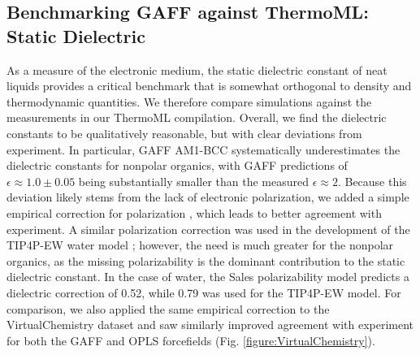 \documentclass[aps,pre,twocolumn,nofootinbib,superscriptaddress,linenumbers]{revtex4-1}
\begin{document}

\subsection{Benchmarking GAFF against ThermoML: Static Dielectric}

As a measure of the electronic medium, the static dielectric constant of neat liquids provides a critical benchmark that is somewhat orthogonal to density and thermodynamic quantities.  
We therefore compare simulations against the measurements in our ThermoML compilation.  
Overall, we find the dielectric constants to be qualitatively reasonable, but with clear deviations from experiment.  
In particular, GAFF AM1-BCC systematically underestimates the dielectric constants for nonpolar organics, with GAFF predictions of $\epsilon \approx 1.0 \pm 0.05$ being substantially smaller than the measured $\epsilon \approx 2$.  
Because this deviation likely stems from the lack of electronic polarization, we added a simple empirical correction for polarization \cite{bosque2002polarizabilities}, which leads to better agreement with experiment.  
A similar polarization correction was used in the development of the TIP4P-EW water model \cite{horn2004}; however, the need is much greater for the nonpolar organics, as the missing polarizability is the dominant contribution to the static dielectric constant.  
In the case of water, the Sales polarizability model predicts a dielectric correction of 0.52, while 0.79 was used for the TIP4P-EW model.  
For comparison, we also applied the same empirical correction to the VirtualChemistry dataset \cite{caleman2011force, van2012gromacs} and saw similarly improved agreement with experiment for both the GAFF and OPLS forcefields (Fig. \ref{figure:VirtualChemistry}).

\end{document}
